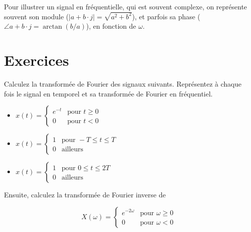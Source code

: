 \documentclass [a4paper, 11pt] {article}
\begin{document}
    Pour illustrer un signal en fréquentielle, qui est souvent complexe, on représente souvent son module ($|a+b\cdot j| = \sqrt{a^2 + b^2}$), et parfois sa phase ($\angle a+b\cdot j = \arctan (b/a)$), en fonction de $\omega$.
    
    
    \pagebreak
    \pagestyle{nextpages}
    \part*{Exercices}
    
    \begin{exercice}[Calculs]{1}
        Calculez la transformée de Fourier des signaux suivants. Représentez à chaque fois le signal en temporel et sa transformée de Fourier en fréquentiel.
        
        \begin{itemize}
            \item $x(t)=\left\{\begin{array}{ll}e^{-t}&\mbox{pour }t\geq 0\\0&\mbox{pour }t<0\end{array}\right.$
            \item $x(t)=\left\{\begin{array}{ll}1&\mbox{pour }-T\leq t\leq T\\0&\mbox{ailleurs}\end{array}\right.$
            \item $x(t)=\left\{\begin{array}{ll}1&\mbox{pour } 0\leq t\leq 2T\\0&\mbox{ailleurs}\end{array}\right.$
        \end{itemize}
    
        Ensuite, calculez la transformée de Fourier inverse de
    
        \begin{equation}
        X(\omega)=\left\{\begin{array}{ll}e^{-2\omega}&\mbox{pour } \omega \geq 0\\0&\mbox{pour } \omega<0 \end{array}\right.
        \end{equation}


    \end{exercice}
        
\end{document}
